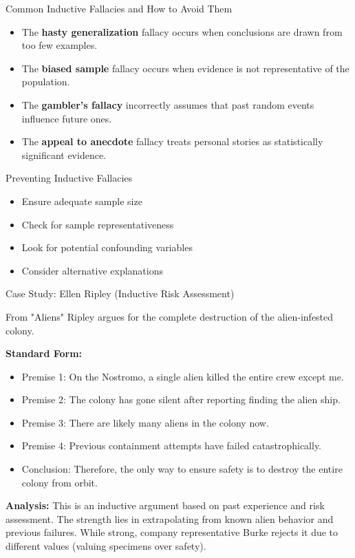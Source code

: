 \documentclass{beamer}
\begin{document}
\begin{frame}{Common Inductive Fallacies and How to Avoid Them}
    \begin{itemize}
        \item The \textbf{hasty generalization} fallacy occurs when conclusions are drawn from too few examples.
        \item The \textbf{biased sample} fallacy occurs when evidence is not representative of the population.
        \item The \textbf{gambler's fallacy} incorrectly assumes that past random events influence future ones.
        \item The \textbf{appeal to anecdote} fallacy treats personal stories as statistically significant evidence.
    \end{itemize}
    
    \begin{block}{Preventing Inductive Fallacies}
        \begin{itemize}
            \item Ensure adequate sample size
            \item Check for sample representativeness
            \item Look for potential confounding variables
            \item Consider alternative explanations
        \end{itemize}
    \end{block}
\end{frame}

\begin{frame}{Case Study: Ellen Ripley (Inductive Risk Assessment)}
    \begin{block}{From "Aliens"}
        Ripley argues for the complete destruction of the alien-infested colony.
    \end{block}
    
    \textbf{Standard Form:}
    \begin{itemize}
        \item Premise 1: On the Nostromo, a single alien killed the entire crew except me.
        \item Premise 2: The colony has gone silent after reporting finding the alien ship.
        \item Premise 3: There are likely many aliens in the colony now.
        \item Premise 4: Previous containment attempts have failed catastrophically.
        \item Conclusion: Therefore, the only way to ensure safety is to destroy the entire colony from orbit.
    \end{itemize}
    
    \textbf{Analysis:} This is an inductive argument based on past experience and risk assessment. The strength lies in extrapolating from known alien behavior and previous failures. While strong, company representative Burke rejects it due to different values (valuing specimens over safety).
\end{frame}
\end{document}
